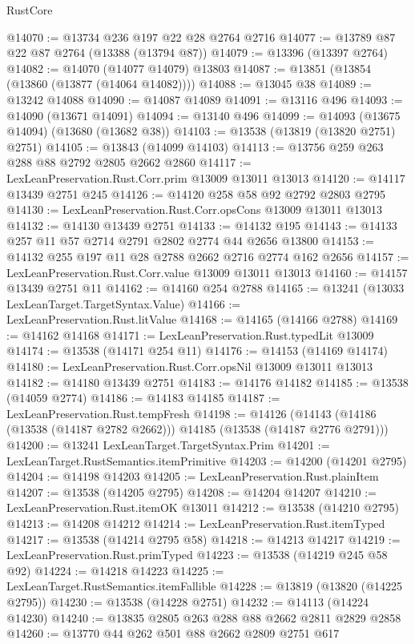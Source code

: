 \begin{lexlean}{RustCore}
\begin{coremodule}
@14070 := @13734 @236 @197 @22 @28 @2764 @2716
@14077 := @13789 @87 @22 @87 @2764 (@13388 (@13794 @87))
@14079 := @13396 (@13397 @2764)
@14082 := @14070 (@14077 @14079) @13803
@14087 := @13851 (@13854 (@13860 (@13877 (@14064 @14082))))
@14088 := @13045 @38
@14089 := @13242 @14088
@14090 := @14087 @14089
@14091 := @13116 @496
@14093 := @14090 (@13671 @14091)
@14094 := @13140 @496
@14099 := @14093 (@13675 @14094) (@13680 (@13682 @38))
@14103 := @13538 (@13819 (@13820 @2751) @2751)
@14105 := @13843 (@14099 @14103)
@14113 := @13756 @259 @263 @288 @88 @2792 @2805 @2662 @2860
@14117 := LexLeanPreservation.Rust.Corr.prim @13009 @13011 @13013
@14120 := @14117 @13439 @2751 @245
@14126 := @14120 @258 @58 @92 @2792 @2803 @2795
@14130 := LexLeanPreservation.Rust.Corr.opsCons @13009 @13011 @13013
@14132 := @14130 @13439 @2751
@14133 := @14132 @195
@14143 := @14133 @257 @11 @57 @2714 @2791 @2802 @2774 @44 @2656 @13800
@14153 := @14132 @255 @197 @11 @28 @2788 @2662 @2716 @2774 @162 @2656
@14157 := LexLeanPreservation.Rust.Corr.value @13009 @13011 @13013
@14160 := @14157 @13439 @2751 @11
@14162 := @14160 @254 @2788
@14165 := @13241 (@13033 LexLeanTarget.TargetSyntax.Value)
@14166 := LexLeanPreservation.Rust.litValue
@14168 := @14165 (@14166 @2788)
@14169 := @14162 @14168
@14171 := LexLeanPreservation.Rust.typedLit @13009
@14174 := @13538 (@14171 @254 @11)
@14176 := @14153 (@14169 @14174)
@14180 := LexLeanPreservation.Rust.Corr.opsNil @13009 @13011 @13013
@14182 := @14180 @13439 @2751
@14183 := @14176 @14182
@14185 := @13538 (@14059 @2774)
@14186 := @14183 @14185
@14187 := LexLeanPreservation.Rust.tempFresh
@14198 := @14126
    (@14143 (@14186 (@13538 (@14187 @2782 @2662))) @14185 (@13538 (@14187 @2776 @2791)))
@14200 := @13241 LexLeanTarget.TargetSyntax.Prim
@14201 := LexLeanTarget.RustSemantics.itemPrimitive
@14203 := @14200 (@14201 @2795)
@14204 := @14198 @14203
@14205 := LexLeanPreservation.Rust.plainItem
@14207 := @13538 (@14205 @2795)
@14208 := @14204 @14207
@14210 := LexLeanPreservation.Rust.itemOK @13011
@14212 := @13538 (@14210 @2795)
@14213 := @14208 @14212
@14214 := LexLeanPreservation.Rust.itemTyped
@14217 := @13538 (@14214 @2795 @58)
@14218 := @14213 @14217
@14219 := LexLeanPreservation.Rust.primTyped
@14223 := @13538 (@14219 @245 @58 @92)
@14224 := @14218 @14223
@14225 := LexLeanTarget.RustSemantics.itemFallible
@14228 := @13819 (@13820 (@14225 @2795))
@14230 := @13538 (@14228 @2751)
@14232 := @14113 (@14224 @14230)
@14240 := @13835 @2805 @263 @288 @88 @2662 @2811 @2829 @2858
@14260 := @13770
    @44
    @262
    @501
    @88
    @2662
    @2809
    @2751
    @617

\end{coremodule}
\end{lexlean}
